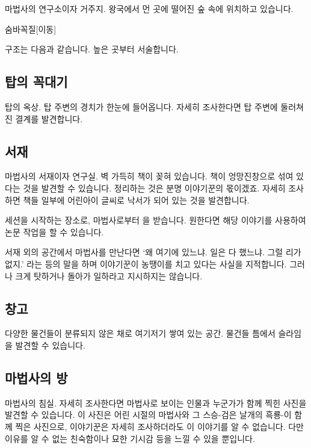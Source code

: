 \documentclass{report}
\begin{document}
	마법사의 연구소이자 거주지. 왕국에서 먼 곳에 떨어진 숲 속에 위치하고 있습니다.
	
	\begin{story}{숨바꼭질}{[이동]}
		
	\end{story}
	
	구조는 다음과 같습니다. 높은 곳부터 서술합니다.

	\subsection*{탑의 꼭대기}
		탑의 옥상. 탑 주변의 경치가 한눈에 들어옵니다. 자세히 조사한다면 탑 주변에 둘러쳐진 결계를 발견합니다.
	
	\subsection*{서재}
		마법사의 서재이자 연구실. 벽 가득히 책이 꽂혀 있습니다. 책이 엉망진창으로 섞여 있다는 것을 발견할 수 있습니다. 정리하는 것은 분명 이야기꾼의 몫이겠죠. 자세히 조사하면 책들 일부에 어린아이 글씨로 낙서가 되어 있는 것을 발견합니다.
		
		세션을 시작하는 장소로, 마법사로부터 을 받습니다. 원한다면 해당 이야기를 사용하여 논문 작업을 할 수 있습니다.
		
		서재 외의 공간에서 마법사를 만난다면 `왜 여기에 있느냐. 일은 다 했느냐. 그럴 리가 없지.' 라는 등의 말을 하며 이야기꾼이 농땡이를 치고 있다는 사실을 지적합니다. 그러나 크게 탓하거나 돌아가 일하라고 지시하지는 않습니다.
	
	\subsection*{창고}
		다양한 물건들이 분류되지 않은 채로 여기저기 쌓여 있는 공간. 물건들 틈에서 슬라임을 발견할 수 있습니다.
	
	\subsection*{마법사의 방}
		마법사의 침실. 자세히 조사한다면 마법사로 보이는 인물과 누군가가 함께 찍힌 사진을 발견할 수 있습니다. 이 사진은 어린 시절의 마법사와 그 스승-검은 날개의 흑룡-이 함께 찍은 사진으로, 이야기꾼은 자세히 조사하더라도 이 이야기를 알 수 없습니다. 다만 이유를 알 수 없는 친숙함이나 묘한 기시감 등을 느낄 수 있을 뿐입니다.
		
\end{document}
